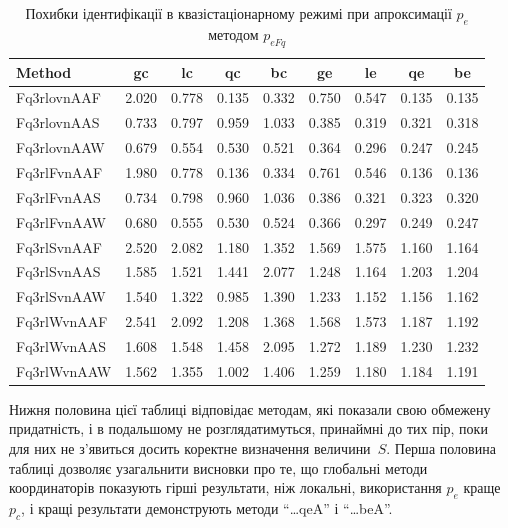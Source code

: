 \begin{table}[htb!]
  \caption{Похибки ідентифікації в квазістаціонарному режимі при апроксимації $p_e$ методом $p_{eFq}$}
  \label{atu:t:err_test_id_Fq}
  \begin{center}
    \begin{tabular}{|l|c|c|c|c|c|c|c|c|}
    \hline
    Method      & gc    & lc    & qc    & bc    & ge     & le    & qe    & be    \\ \hline
    Fq3rlovnAAF & 2.020 & 0.778 & 0.135 & 0.332 & 0.750  & 0.547 & 0.135 & 0.135 \\ \hline
    Fq3rlovnAAS & 0.733 & 0.797 & 0.959 & 1.033 & 0.385  & 0.319 & 0.321 & 0.318 \\ \hline
    Fq3rlovnAAW & 0.679 & 0.554 & 0.530 & 0.521 & 0.364  & 0.296 & 0.247 & 0.245 \\ \hline
    Fq3rlFvnAAF & 1.980 & 0.778 & 0.136 & 0.334 & 0.761  & 0.546 & 0.136 & 0.136 \\ \hline
    Fq3rlFvnAAS & 0.734 & 0.798 & 0.960 & 1.036 & 0.386  & 0.321 & 0.323 & 0.320 \\ \hline
    Fq3rlFvnAAW & 0.680 & 0.555 & 0.530 & 0.524 & 0.366  & 0.297 & 0.249 & 0.247 \\ \hline
    Fq3rlSvnAAF & 2.520 & 2.082 & 1.180 & 1.352 & 1.569  & 1.575 & 1.160 & 1.164 \\ \hline
    Fq3rlSvnAAS & 1.585 & 1.521 & 1.441 & 2.077 & 1.248  & 1.164 & 1.203 & 1.204 \\ \hline
    Fq3rlSvnAAW & 1.540 & 1.322 & 0.985 & 1.390 & 1.233  & 1.152 & 1.156 & 1.162 \\ \hline
    Fq3rlWvnAAF & 2.541 & 2.092 & 1.208 & 1.368 & 1.568  & 1.573 & 1.187 & 1.192 \\ \hline
    Fq3rlWvnAAS & 1.608 & 1.548 & 1.458 & 2.095 & 1.272  & 1.189 & 1.230 & 1.232 \\ \hline
    Fq3rlWvnAAW & 1.562 & 1.355 & 1.002 & 1.406 & 1.259  & 1.180 & 1.184 & 1.191 \\ \hline
    \end{tabular}
  \end{center}
\end{table}

Нижня половина цієї таблиці відповідає методам, які показали
свою обмежену придатність, і в подальшому не розглядатимуться,
принаймні до тих пір, поки для них не з'явиться досить коректне
визначення величини~$S$.
Перша половина таблиці дозволяє узагальнити висновки
про те, що глобальні методи координаторів показують гірші
результати, ніж локальні, використання
$p_e$ краще
$p_c$, і кращі результати демонструють методи ``\ldots qeA'' і ``\ldots beA''.

